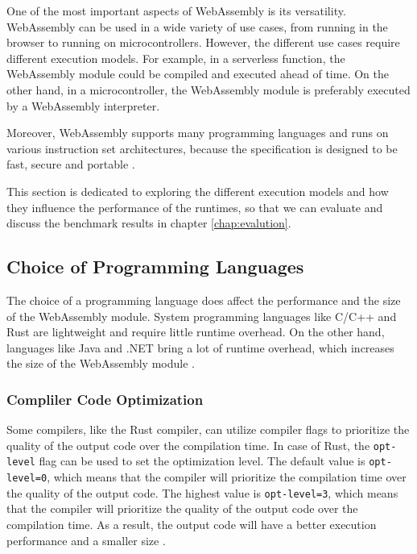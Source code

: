 One of the most important aspects of WebAssembly is its versatility. WebAssembly can be used in a wide variety of use cases, from running in the browser to running on microcontrollers. However, the different use cases require different execution models. For example, in a serverless function, the WebAssembly module could be compiled and executed ahead of time. On the other hand, in a microcontroller, the WebAssembly module is preferably executed by a WebAssembly interpreter. 

Moreover, \gls{WebAssembly} supports many programming languages and runs on various instruction set architectures, because the specification is designed to be fast, secure and portable \cite{butcher_2023_the}. 

This section is dedicated to exploring the different execution models and how they influence the performance of the runtimes, so that we can evaluate and discuss the benchmark results in chapter \ref{chap:evalution}.

\subsection{Choice of Programming Languages}
\label{sec:programming-languages}

The choice of a programming language does affect the performance and the size of the WebAssembly module. System programming languages like C/C++ and Rust are lightweight and require little runtime overhead. On the other hand, languages like Java and .NET bring a lot of runtime overhead, which increases the size of the WebAssembly module \cite{butcher_2023_the}. %

\subsubsection{Compliler Code Optimization}
\label{sec:compliler-code-optimization}

Some compilers, like the Rust compiler, can utilize compiler flags to prioritize the quality of the output code over the compilation time. In case of Rust, the \texttt{opt-level} flag can be used to set the optimization level. The default value is \texttt{opt-level=0}, which means that the compiler will prioritize the compilation time over the quality of the output code. The highest value is \texttt{opt-level=3}, which means that the compiler will prioritize the quality of the output code over the compilation time. As a result, the output code will have a better execution performance and a smaller size \cite{rustlangcommunity_2021_customizing}. 

